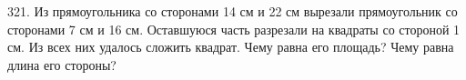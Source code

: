 321. Из прямоугольника со сторонами 14 см и 22 см вырезали прямоугольник со сторонами
7 см и 16 см. Оставшуюся часть разрезали на квадраты со стороной 1 см. Из всех них удалось сложить квадрат. Чему равна его площадь? Чему равна длина его стороны?\\
